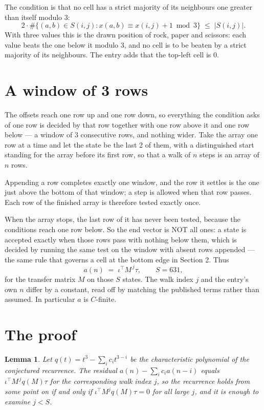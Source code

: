 \documentclass[11pt,a4paper]{article}
\theoremstyle{plain}
\newtheorem{lemma}[theorem]{Lemma}
\theoremstyle{definition}
\begin{document}
The condition is that no cell has a strict majority of its neighbours one greater than itself modulo $3$:
\[
2\cdot\#\{(a,b)\in S(i,j) : x(a,b)\equiv x(i,j)+1 \bmod 3\}\;\le\;|S(i,j)| .
\]
With three values this is the drawn position of rock, paper and scissors: each value beats the one below it modulo $3$, and no cell is to be beaten by a strict majority of its neighbours. The entry adds that the top-left cell is $0$.

\section{A window of 3 rows}

The offsets reach one row up and one row down, so everything the condition asks of one row is
decided by that row together with one row above it and one row below --- a window of
$3$ consecutive rows, and nothing wider. Take the array one row at a time
and let the state be the last 2 of them, with a distinguished start standing for the
array before its first row, so that a walk of $n$ steps is an array of $n$ rows.

Appending a row completes exactly one window, and the row it settles is the one just above the bottom of that window; a step is
allowed when that row passes. Each row of the finished
array is therefore tested exactly once.

When the array stops, the last row of it has never been tested, because the
conditions reach one row below. So the end vector is NOT all ones: a state is accepted exactly when
those rows pass with nothing below them, which is decided by running the same test on the window
with absent rows appended --- the same rule that governs a cell at the bottom edge in
Section 2.
Thus
\[
a(n)\;=\;\iota^{\!\top}M^{\,j}\tau ,\qquad S=631,
\]
for the transfer matrix $M$ on those $S$ states. The walk index $j$ and the entry's own $n$
differ by a constant, read off by matching the published terms rather than assumed. In
particular $a$ is $C$-finite.

\section{The proof}

\begin{lemma}\label{lem:crit}
Let $q(t)=t^{3}-\sum_i c_it^{3-i}$ be the characteristic polynomial of the
conjectured recurrence. The residual $a(n)-\sum_ic_ia(n-i)$ equals
$\iota^{\!\top}M^{\,j}q(M)\tau$ for the corresponding walk index $j$, so the recurrence
holds from some point on if and only if $\iota^{\!\top}M^{j}q(M)\tau=0$ for all large $j$,
and it is enough to examine $j<S$.
\end{lemma}
\end{document}

